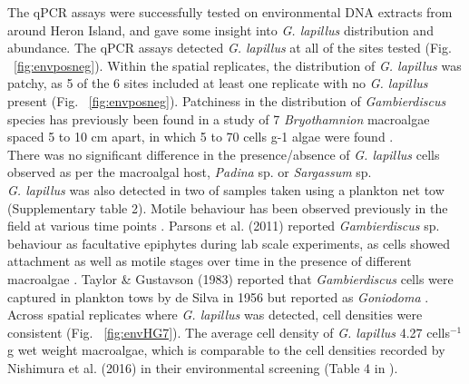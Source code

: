 \documentclass[12pt]{article}
\begin{document}
The qPCR assays were successfully tested on environmental DNA extracts from around Heron Island, and gave some insight into \emph{G. lapillus} distribution and abundance. 
The qPCR assays detected \emph{G. lapillus} at all of the sites tested (Fig. ~\ref{fig:envposneg}). 
Within the spatial replicates, the distribution of \emph{G. lapillus} was patchy, as 5 of the 6 sites included at least one replicate with no \textit{G. lapillus} present (Fig. ~\ref{fig:envposneg}). 
Patchiness in the distribution of \textit{Gambierdiscus} species has previously been found in a study of 7 \emph{Bryothamnion} macroalgae spaced 5 to 10 cm apart, in which 5 to 70 cells g-1 algae were found \citep{taylor1986underwater}.\\
There was no significant difference in the presence/absence of \emph{G. lapillus} cells observed as per the macroalgal host, \emph{Padina} sp. or \emph{Sargassum} sp.\\
\emph{G. lapillus} was also detected in two of samples taken using a plankton net tow (Supplementary table 2). 
Motile behaviour has been observed previously in the field at various time points \citep{yasumoto1977finding,bomber1987ecology}. 
Parsons et al. (2011) reported \emph{Gambierdiscus} sp. behaviour as facultative epiphytes during lab scale experiments, as cells showed attachment as well as motile stages over time in the presence of different macroalgae \citep{parsons2011examination}. 
Taylor \& Gustavson (1983) reported that \emph{Gambierdiscus} cells were captured in plankton tows by de Silva in 1956 but reported as \emph{Goniodoma} \citep{taylor1986underwater}.
Across spatial replicates where \emph{G. lapillus} was detected, cell densities were consistent (Fig. ~\ref{fig:envHG7}). 
The average cell density of \emph{G. lapillus} 4.27 cells$^{-1}$g wet weight macroalgae, which is comparable to the cell densities recorded by Nishimura et al. (2016) in their environmental screening (Table 4 in \citep{nishimura2016quantitative}).\\
\end{document}
